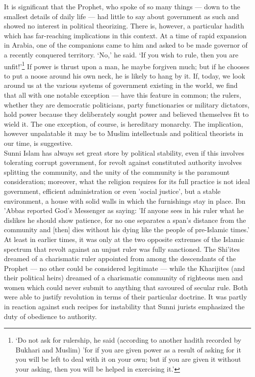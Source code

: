\documentclass[10pt, twoside]{book}
\begin{document}
It is significant that the Prophet, who spoke of so many things --- down to the smallest details of 
daily life --- had little to say about government as such and showed no interest in political 
theorizing. There is, however, a particular hadith which has far\hyp{}reaching implications in this 
context. At a time of rapid expansion in Arabia, one of the companions came to him and asked to be 
made governor of a recently conquered territory. `No,' he said. `If you wish to rule, then you are 
unfit!'\footnote{`Do not ask for rulership, he said (according to another hadith recorded by Bukhari and Muslim) 'for if you are given power as a result of asking for it you will be left to deal with it on your 
own; but if you are given it without your asking, then you will be helped in exercising it.'} If power is thrust upon a man, he maybe forgiven much; but if he chooses to put a noose 
around his own neck, he is likely to hang by it. If, today, we look around us at the various systems 
of government existing in the world, we find that all with one notable exception --- have this feature 
in common; the rulers, whether they are democratic politicians, party functionaries or military 
dictators, hold power because they deliberately sought power and believed themselves fit to wield it. 
The one exception, of course, is hereditary monarchy. The implication, however unpalatable it may be 
to Muslim intellectuals and political theorists in our time, is suggestive. \\

Sunni Islam has always set great store by political stability, even if this involves tolerating 
corrupt government, for revolt against constituted authority involves splitting the community, and 
the unity of the community is the paramount consideration; moreover, what the religion requires for 
its full practice is not ideal government, efficient administration or even 'social justice', but a 
stable environment, a house with solid walls in which the furnishings stay in place. Ibn 'Abbas 
reported God's Messenger as saying: 'If anyone sees in his ruler what he dislikes he should show 
patience, for no one separates a span's distance from the community and [then] dies without his dying 
like the people of pre\hyp{}Islamic times.' \\

At least in earlier times, it was only at the two opposite extremes of the Islamic spectrum that 
revolt against an unjust ruler was fully sanctioned. The Shi'ites dreamed of a charismatic ruler 
appointed from among the descendants of the Prophet --- no other could be considered legitimate --- while 
the Kharijites (and their political heirs) dreamed of a charismatic community of righteous men and 
women which could never submit to anything that savoured of secular rule. Both were able to justify 
revolution in terms of their particular doctrine. It was partly in reaction against such recipes for 
instability that Sunni jurists emphasized the duty of obedience to authority. \\
\end{document}
